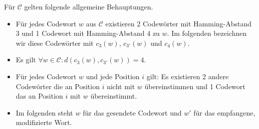 Für $\mathcal{C}$ gelten folgende allgemeine Behauptungen.
\begin{itemize}
	\item Für jedes Codewort $w$ aus $\mathcal{C}$ existieren 2 Codewörter mit Hamming-Abstand 3 und 1 Codewort mit Hamming-Abstand 4 zu $w$.
	Im folgenden bezeichnen wir diese Codewörter mit $c_{3}(w)$, $c_{3'}(w)$ und $c_4(w)$.
	\item Es gilt $\forall w \in \mathcal{C}: d(c_{3}(w),c_{3'}(w)) = 4$.
	\item Für jedes Codewort $w$ und jede Position $i$ gilt: Es existieren 2 andere Codewörter die an Position $i$ nicht mit $w$ übereinstimmen und 1 Codewort das an Position $i$ mit $w$ übereinstimmt.
	\item Im folgenden steht $w$ für das gesendete Codewort und $w'$ für das empfangene, modifizierte Wort.
\end{itemize}
